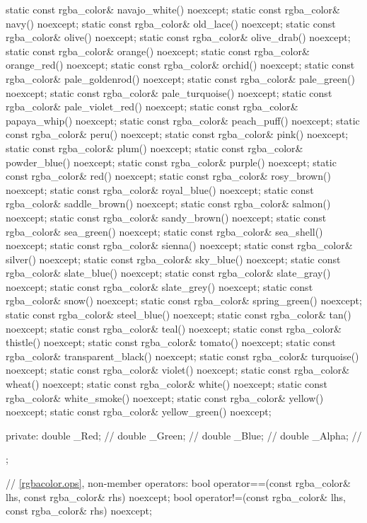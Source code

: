 \begin{codeblock}
{{{{{    static const rgba_color& navajo_white() noexcept;
    static const rgba_color& navy() noexcept;
    static const rgba_color& old_lace() noexcept;
    static const rgba_color& olive() noexcept;
    static const rgba_color& olive_drab() noexcept;
    static const rgba_color& orange() noexcept;
    static const rgba_color& orange_red() noexcept;
    static const rgba_color& orchid() noexcept;
    static const rgba_color& pale_goldenrod() noexcept;
    static const rgba_color& pale_green() noexcept;
    static const rgba_color& pale_turquoise() noexcept;
    static const rgba_color& pale_violet_red() noexcept;
    static const rgba_color& papaya_whip() noexcept;
    static const rgba_color& peach_puff() noexcept;
    static const rgba_color& peru() noexcept;
    static const rgba_color& pink() noexcept;
    static const rgba_color& plum() noexcept;
    static const rgba_color& powder_blue() noexcept;
    static const rgba_color& purple() noexcept;
    static const rgba_color& red() noexcept;
    static const rgba_color& rosy_brown() noexcept;
    static const rgba_color& royal_blue() noexcept;
    static const rgba_color& saddle_brown() noexcept;
    static const rgba_color& salmon() noexcept;
    static const rgba_color& sandy_brown() noexcept;
    static const rgba_color& sea_green() noexcept;
    static const rgba_color& sea_shell() noexcept;
    static const rgba_color& sienna() noexcept;
    static const rgba_color& silver() noexcept;
    static const rgba_color& sky_blue() noexcept;
    static const rgba_color& slate_blue() noexcept;
    static const rgba_color& slate_gray() noexcept;
    static const rgba_color& slate_grey() noexcept;
    static const rgba_color& snow() noexcept;
    static const rgba_color& spring_green() noexcept;
    static const rgba_color& steel_blue() noexcept;
    static const rgba_color& tan() noexcept;
    static const rgba_color& teal() noexcept;
    static const rgba_color& thistle() noexcept;
    static const rgba_color& tomato() noexcept;
    static const rgba_color& transparent_black() noexcept;
    static const rgba_color& turquoise() noexcept;
    static const rgba_color& violet() noexcept;
    static const rgba_color& wheat() noexcept;
    static const rgba_color& white() noexcept;
    static const rgba_color& white_smoke() noexcept;
    static const rgba_color& yellow() noexcept;
    static const rgba_color& yellow_green() noexcept;

private:
    double _Red;   // \expos
    double _Green; // \expos
    double _Blue;  // \expos
    double _Alpha; // \expos
  };

  // \ref{rgbacolor.ops}, non-member operators:
  bool operator==(const rgba_color& lhs, const rgba_color& rhs) noexcept;
  bool operator!=(const rgba_color& lhs, const rgba_color& rhs) noexcept;
} } } }
\end{codeblock}

